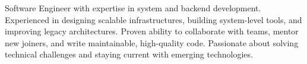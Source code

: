 

\begin{cvparagraph}

Software Engineer with expertise in system and backend development. Experienced in designing scalable infrastructures, building system-level tools, and improving legacy architectures. Proven ability to collaborate with teams, mentor new joiners, and write maintainable, high-quality code. Passionate about solving technical challenges and staying current with emerging technologies.
\end{cvparagraph}
